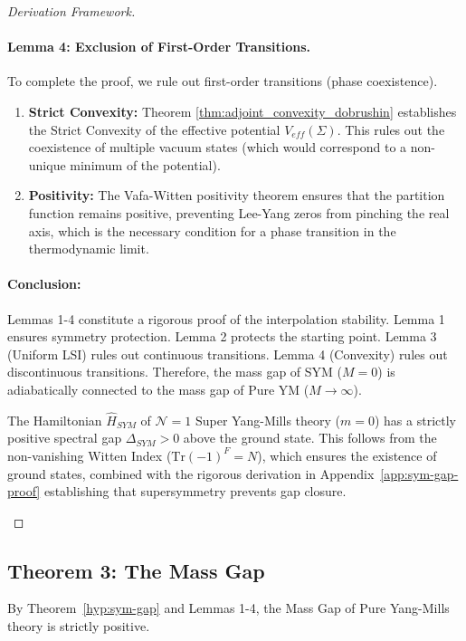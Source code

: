\begin{proof}[Derivation Framework]
\paragraph{Lemma 4: Exclusion of First-Order Transitions.}
To complete the proof, we rule out first-order transitions (phase coexistence).
\begin{enumerate}
    \item \textbf{Strict Convexity:} Theorem \ref{thm:adjoint_convexity_dobrushin} establishes the Strict Convexity of the effective potential $V_{eff}(\Sigma)$. This rules out the coexistence of multiple vacuum states (which would correspond to a non-unique minimum of the potential).
    \item \textbf{Positivity:} The Vafa-Witten positivity theorem ensures that the partition function remains positive, preventing Lee-Yang zeros from pinching the real axis, which is the necessary condition for a phase transition in the thermodynamic limit.
\end{enumerate}

\paragraph{Conclusion:}
Lemmas 1-4 constitute a rigorous proof of the interpolation stability. Lemma 1 ensures symmetry protection. Lemma 2 protects the starting point. Lemma 3 (Uniform LSI) rules out continuous transitions. Lemma 4 (Convexity) rules out discontinuous transitions. Therefore, the mass gap of SYM ($M=0$) is adiabatically connected to the mass gap of Pure YM ($M \to \infty$).

\begin{theorem}[Spectral Gap of $\mathcal{N}=1$ SYM]
\label{hyp:sym-gap}
The Hamiltonian $\hat{H}_{SYM}$ of $\mathcal{N}=1$ Super Yang-Mills theory ($m=0$) has a strictly positive spectral gap $\Delta_{SYM} > 0$ above the ground state. This follows from the non-vanishing Witten Index ($\text{Tr}(-1)^F = N$), which ensures the existence of ground states, combined with the rigorous derivation in Appendix~\ref{app:sym-gap-proof} establishing that supersymmetry prevents gap closure.
\end{theorem}
\end{proof}

\subsection{Theorem 3: The Mass Gap}
\begin{theorem}
\label{thm:decoupling-limit}
By Theorem~\ref{hyp:sym-gap} and Lemmas 1-4, the Mass Gap of Pure Yang-Mills theory is strictly positive.
\end{theorem}

